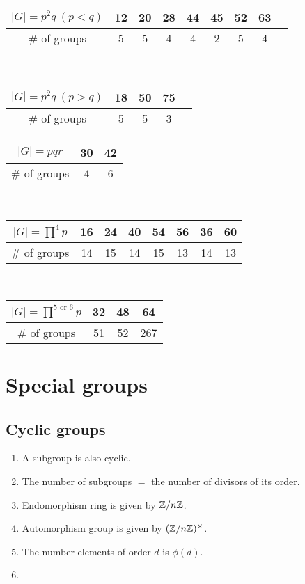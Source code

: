 \documentclass{../note}
\begin{document}
\begin{table}[h!]
\centering
\begin{tabular}{c|c|ccccccc}
\hline
$|G|=p^2q\ (p<q)$&12&20&28&44&45&52&63\\
\hline
$\#$ of groups&5&5&4&4&2&5&4\\
\hline
\end{tabular}
\vspace{10pt}\\
\begin{tabular}{c|cccc}
\hline
$|G|=p^2q\ (p>q)$&18&50&75\\
\hline
$\#$ of groups&5&5&3\\
\hline
\end{tabular}
\hspace{10pt}
\begin{tabular}{c|cc}
\hline
$|G|=pqr$&30&42\\
\hline
$\#$ of groups&4&6\\
\hline
\end{tabular}
\vspace{10pt}\\
\begin{tabular}{c|c|cccc|c|c}
\hline
$|G|=\prod^4p$&16&24&40&54&56&36&60\\
\hline
$\#$ of groups&14&15&14&15&13&14&13\\
\hline
\end{tabular}
\vspace{10pt}\\
\begin{tabular}{c|c|c||c}
\hline
$|G|=\prod^{5\text{ or }6}p$&32&48&64\\
\hline
$\#$ of groups&51&52&267\\
\hline
\end{tabular}
\end{table}






\section{Special groups}

\subsection{Cyclic groups}
\begin{enumerate}
\item A subgroup is also cyclic.
\item The number of subgroups $=$ the number of divisors of its order.
\item Endomorphism ring is given by $\mathbb{Z}/n\mathbb{Z}$.
\item Automorphism group is given by $(\mathbb{Z}/n\mathbb{Z})^\times$.
\item The number elements of order $d$ is $\phi(d)$.
\item
\end{enumerate}
\end{document}
